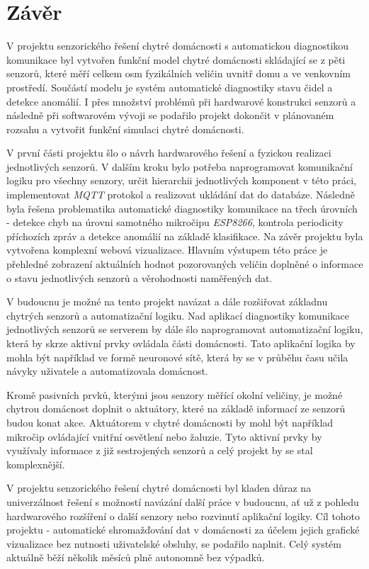 \chapter{Závěr} \label{chap:conclusion}
V projektu senzorického řešení chytré domácnosti s automatickou diagnostikou komunikace byl vytvořen funkční model chytré domácnosti skládající se z pěti senzorů, které měří celkem osm fyzikálních veličin uvnitř domu a ve venkovním prostředí. Součástí modelu je systém automatické diagnostiky stavu čidel a detekce anomálií. I přes množství problémů při hardwarové konstrukci senzorů a následně při softwarovém vývoji se podařilo projekt dokončit v plánovaném rozsahu a vytvořit funkční simulaci chytré domácnosti.  \par
V první části projektu šlo o návrh hardwarového řešení a fyzickou realizaci jednotlivých senzorů. V dalším kroku bylo potřeba naprogramovat komunikační logiku pro všechny senzory, určit hierarchii jednotlivých komponent v této práci, implementovat \textit{MQTT} protokol a realizovat ukládání dat do databáze. Následně byla řešena problematika automatické diagnostiky komunikace na třech úrovních - detekce chyb na úrovni samotného mikročipu \textit{ESP8266}, kontrola periodicity příchozích zpráv a detekce anomálií na základě klasifikace. Na závěr projektu byla vytvořena komplexní webová vizualizace. Hlavním výstupem této práce je přehledné zobrazení aktuálních hodnot pozorovaných veličin doplněné o informace o stavu jednotlivých senzorů a věrohodnosti naměřených dat. \par
V budoucnu je možné na tento projekt navázat a dále rozšiřovat základnu chytrých senzorů a automatizační logiku. Nad aplikací diagnostiky komunikace jednotlivých senzorů se serverem by dále šlo naprogramovat automatizační logiku, která by skrze aktivní prvky ovládala části domácnosti. Tato aplikační logika by mohla být například ve formě neuronové sítě, která by se v průběhu času učila návyky uživatele a automatizovala domácnost. \par
Kromě pasivních prvků, kterými jsou senzory měřící okolní veličiny, je možné chytrou domácnost doplnit o aktuátory, které na základě informací ze senzorů budou konat akce. Aktuátorem v chytré domácnosti by mohl být například mikročip ovládající vnitřní osvětlení nebo žaluzie. Tyto aktivní prvky by využívaly informace z již sestrojených senzorů a celý projekt by se stal komplexnější. \par 
V projektu senzorického řešení chytré domácnosti byl kladen důraz na univerzálnost řešení s možností navázání další práce v budoucnu, ať už z pohledu hardwarového rozšíření o další senzory nebo rozvinutí aplikační logiky. Cíl tohoto projektu - automatické shromažďování dat v domácnosti za účelem jejich grafické vizualizace bez nutnosti uživatelské obsluhy, se podařilo naplnit. Celý systém aktuálně běží několik měsíců plně autonomně bez výpadků.
